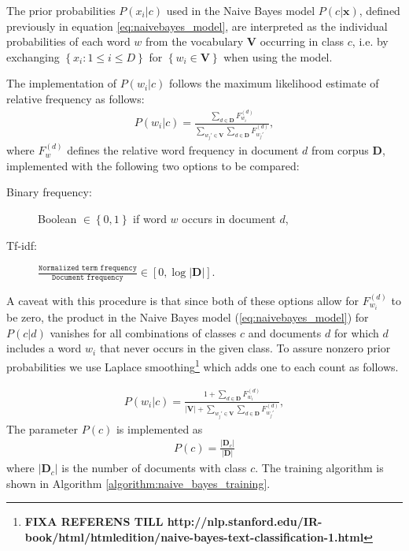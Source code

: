 
The prior probabilities $P(x_i\vert c)$ used in the Naive Bayes model $P(c\vert\mathbf{x})$, defined previously in equation \ref{eq:naivebayes_model}, are interpreted as the individual probabilities of each word $w$ from the vocabulary $\mathbf{V}$ occurring in class $c$, i.e. by exchanging $\left\{x_i : 1 \le i \le D\right\}$ for $\left\{w_i \in \mathbf{V}\right\}$ when using the model.

The implementation of $P(w_i\vert c)$ follows the maximum likelihood estimate of relative frequency as follows:
\begin{align}
P(w_i\vert c) =
\frac
	{
		\sum_{d \in \mathbf{D}} F_{w_i}^{(d)}
	}
	{
		\sum_{w_j' \in \mathbf{V}} \sum_{d \in \mathbf{D}}  F_{w_j'}^{(d)}
	},
\end{align}
where $F_w^{(d)}$ defines the relative word frequency in document $d$ from corpus $\mathbf{D}$, implemented with the following two options to be compared:
\begin{description}
  \item[Binary frequency:] Boolean $\in \left\{0,1\right\}$ if word $w$ occurs in document $d$,
  \item[Tf-idf:] $\frac{\texttt{Normalized term frequency}}{\texttt{Document frequency}} \in \left[0, \log \left\vert \mathbf{D}\right\vert\right]$.
\end{description}
A caveat with this procedure is that since both of these options allow for $F_{w_i}^{(d)}$ to be zero, the product in the Naive Bayes model (\ref{eq:naivebayes_model}) for $P(c\vert d)$ vanishes for all combinations of classes $c$ and documents $d$ for which $d$ includes a word $w_i$ that never occurs in the given class. To assure nonzero prior probabilities we use Laplace smoothing\footnote{\textbf{FIXA REFERENS TILL http://nlp.stanford.edu/IR-book/html/htmledition/naive-bayes-text-classification-1.html}} which adds one to each count as follows.

\begin{align}
P(w_i\vert c) =
\frac
	{
		1 + \sum_{d \in \mathbf{D}} F_{w_i}^{(d)}
	}
	{
		\left\vert\mathbf{V}\right\vert + \sum_{w_j' \in \mathbf{V}} \sum_{d \in \mathbf{D}} F_{w_j'}^{(d)}
	},
\end{align}
The parameter $P(c)$ is implemented as
\begin{align}
P(c) = \frac{\left\vert\mathbf{D}_c\right\vert}{\left\vert\mathbf{D}\right\vert}
\end{align}
where $\left\vert\mathbf{D}_c\right\vert$ is the number of documents with class $c$. The training algorithm is shown in Algorithm \ref{algorithm:naive_bayes_training}.

